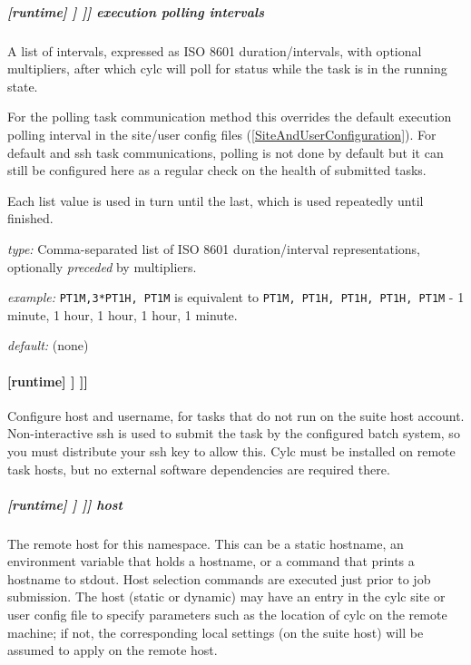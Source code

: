 \subparagraph[execution polling intervals]{[runtime] \textrightarrow [[\_\_NAME\_\_]] \textrightarrow [[[job]]] \textrightarrow execution polling intervals}
\label{ExecutionPollingIntervals}

A list of intervals, expressed as ISO 8601 duration/intervals, with optional
multipliers, after which cylc will poll for status while the task is in the
running state.

For the polling task communication method this overrides the default
execution polling interval in the site/user config files
(\ref{SiteAndUserConfiguration}). For default and ssh task communications,
polling is not done by default but it can still be configured here as a
regular check on the health of submitted tasks.

Each list value is used in turn until the last, which is used repeatedly
until finished.

\begin{myitemize}
    \item {\em type:} Comma-separated list of ISO 8601 duration/interval
        representations, optionally {\em preceded} by multipliers.
    \item {\em example:} \lstinline=PT1M,3*PT1H, PT1M= is equivalent to
    \lstinline=PT1M, PT1H, PT1H, PT1H, PT1M= - 1 minute, 1 hour, 1 hour, 1
    hour, 1 minute.
    \item {\em default:} (none)
\end{myitemize}

\paragraph[{[[[}remote{]]]}]{[runtime] \textrightarrow [[\_\_NAME\_\_]] \textrightarrow [[[remote]]]}

Configure host and username, for tasks that do not run on the suite host
account. Non-interactive ssh is used to submit the task by the configured
batch system, so you must distribute your ssh key to allow
this. Cylc must be installed on remote task hosts, but no external
software dependencies are required there.

\subparagraph[host]{[runtime] \textrightarrow [[\_\_NAME\_\_]] \textrightarrow [[[remote]]] \textrightarrow host}
\label{DynamicHostSelection}

The remote host for this namespace. This can be a static hostname, an
environment variable that holds a hostname, or a command that prints a
hostname to stdout. Host selection commands are executed just prior to
job submission. The host (static or dynamic) may have an entry in the
cylc site or user config file to specify parameters such as the location
of cylc on the remote machine; if not, the corresponding local settings
(on the suite host) will be assumed to apply on the remote host.

